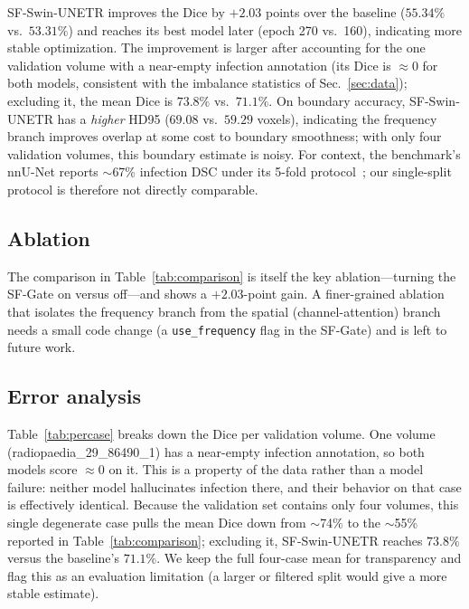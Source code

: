 \documentclass{article}
\begin{document}
SF-Swin-UNETR improves the Dice by \textbf{$+2.03$} points over the baseline ($55.34\%$ vs.\ $53.31\%$) and reaches its best model later (epoch 270 vs.\ 160), indicating more stable optimization. The improvement is larger after accounting for the one validation volume with a near-empty infection annotation (its Dice is $\approx0$ for both models, consistent with the imbalance statistics of Sec.~\ref{sec:data}); excluding it, the mean Dice is \textbf{$73.8\%$} vs.\ \textbf{$71.1\%$}. On boundary accuracy, SF-Swin-UNETR has a \emph{higher} HD95 ($69.08$ vs.\ $59.29$ voxels), indicating the frequency branch improves overlap at some cost to boundary smoothness; with only four validation volumes, this boundary estimate is noisy. For context, the benchmark's nnU-Net reports $\sim$67\% infection DSC under its 5-fold protocol~\citep{ma2021benchmark}; our single-split protocol is therefore not directly comparable.

\subsection{Ablation}

The comparison in Table~\ref{tab:comparison} is itself the key ablation---turning the SF-Gate on versus off---and shows a $+2.03$-point gain. A finer-grained ablation that isolates the frequency branch from the spatial (channel-attention) branch needs a small code change (a \texttt{use\_frequency} flag in the SF-Gate) and is left to future work.

\subsection{Error analysis}

Table~\ref{tab:percase} breaks down the Dice per validation volume. One volume (radiopaedia\_29\_86490\_1) has a near-empty infection annotation, so both models score $\approx0$ on it. This is a property of the data rather than a model failure: neither model hallucinates infection there, and their behavior on that case is effectively identical. Because the validation set contains only four volumes, this single degenerate case pulls the mean Dice down from $\sim$74\% to the $\sim$55\% reported in Table~\ref{tab:comparison}; excluding it, SF-Swin-UNETR reaches $73.8\%$ versus the baseline's $71.1\%$. We keep the full four-case mean for transparency and flag this as an evaluation limitation (a larger or filtered split would give a more stable estimate).
\end{document}
